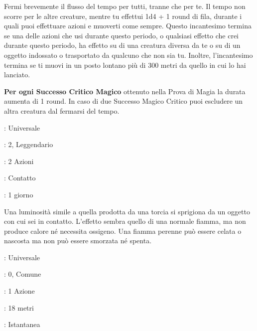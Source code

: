 \begin{multicols}{2}
Fermi brevemente il flusso del tempo per tutti, tranne che per te. Il tempo non scorre per le altre creature, mentre tu effettui 1d4 + 1 round di fila, durante i quali puoi effettuare azioni e muoverti come sempre. Questo incantesimo termina se una delle azioni che usi durante questo periodo, o qualsiasi effetto che crei durante questo periodo, ha effetto su di una creatura diversa da te o su di un oggetto indossato o trasportato da qualcuno che non sia tu. Inoltre, l'incantesimo termina se ti muovi in un posto lontano più di 300 metri da quello in cui lo hai lanciato.

\textbf{Per ogni Successo Critico Magico} ottenuto nella Prova di Magia la durata aumenta di 1 round. In caso di due Successo Magico Critico puoi escludere un altra creatura dal fermarsi del tempo.

\noindent\colorbox{OBSSgold!10}{
\begin{minipage}{0.95\linewidth}
\begin{description}[noitemsep, topsep=0pt, parsep=0pt, partopsep=0pt, leftmargin=0cm, labelwidth=1.3cm]
	\item[\textbf{Lista}]: Universale
	\item[\textbf{Livello}]: 2, Leggendario
	\item[\textbf{Lancio}]: 2 Azioni
	\item[\textbf{Gittata}]: Contatto
	\item[\textbf{Durata}]: 1 giorno
\end{description}
\end{minipage}}\smallskip

Una luminosità simile a quella prodotta da una torcia si sprigiona da un oggetto con cui sei in contatto. L'effetto sembra quello di una normale fiamma, ma non produce calore né necessita ossigeno. Una fiamma perenne può essere celata o nascosta ma non può essere smorzata né spenta.

\noindent\colorbox{OBSSgold!10}{
\begin{minipage}{0.95\linewidth}
\begin{description}[noitemsep, topsep=0pt, parsep=0pt, partopsep=0pt, leftmargin=0cm, labelwidth=1.3cm]
	\item[\textbf{Lista}]: Universale
	\item[\textbf{Livello}]: 0, Comune
	\item[\textbf{Lancio}]: 1 Azione
	\item[\textbf{Gittata}]: 18 metri
	\item[\textbf{Durata}]: Istantanea
\end{description}
\end{minipage}}\smallskip


\end{multicols}
